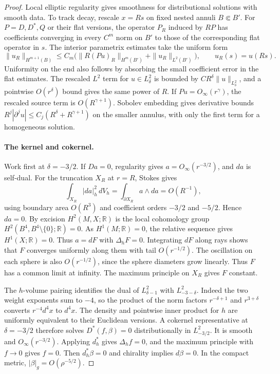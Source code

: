 \documentclass[11pt,letterpaper]{article}
\numberwithin{equation}{section}
\begin{document}
\begin{proof}
Local elliptic regularity gives smoothness for distributional solutions
with smooth data. To track decay, rescale \(x=Rs\) on fixed nested
annuli \(B\Subset B'\). For \(P=D,D^*,Q\) or their flat versions, the
operator \(P_R\) induced by \(RP\) has coefficients converging in every
\(C^m\) norm on \(B'\) to those of the corresponding flat operator in
\(s\). The interior parametrix estimates
\cite[estimate~(2.4)]{LockhartMcOwen1985Elliptic} take the uniform form
\[
 \|u_R\|_{H^{m+1}(B)}
 \le C_m\bigl(\|R(Pu)_R\|_{H^m(B')}+\|u_R\|_{L^2(B')}\bigr),
 \qquad u_R(s)=u(Rs).
\]
Uniformity on the end also follows by absorbing the small coefficient
error in the flat estimates. The rescaled \(L^2\) term for \(u\in
L^2_\delta\) is bounded by \(C R^\delta\|u\|_{L^2_\delta}\), and a
pointwise \(O(r^\delta)\) bound gives the same power of \(R\).
If \(Pu=O_\infty(r^\gamma)\), the rescaled source term is
\(O(R^{\gamma+1})\). Sobolev embedding gives derivative bounds
\(R^j|\partial^j u|\le C_j(R^\delta+R^{\gamma+1})\) on the smaller
annulus, with only the first term for a homogeneous solution.

\paragraph{The kernel and cokernel.}
Work first at \(\delta=-3/2\). If \(Da=0\), regularity gives
\(a=O_\infty(r^{-3/2})\), and \(da\) is self-dual. For the
truncation \(X_R\) at \(r=R\), Stokes gives
\[
 \int_{X_R}|da|_h^2\,dV_h
 =\int_{\partial X_R}a\wedge da=O(R^{-1}),
\]
using boundary area \(O(R^3)\) and coefficient orders \(-3/2\)
and \(-5/2\). Hence \(da=0\).
By excision \(H^2(M,X;\mathbb R)\) is the local cohomology group
\(H^2(B^4,B^4\setminus\{0\};\mathbb R)=0\). As \(H^1(M;\mathbb R)=0\),
the relative sequence gives \(H^1(X;\mathbb R)=0\). Thus \(a=dF\)
with \(\Delta_hF=0\).
Integrating \(dF\) along rays shows that \(F\) converges uniformly
along them with tail \(O(r^{-1/2})\). The oscillation on each sphere is
also \(O(r^{-1/2})\), since the sphere diameters grow linearly. Thus
\(F\) has a common limit at infinity. The maximum principle on \(X_R\)
gives \(F\) constant.

The \(h\)-volume pairing identifies the dual of \(L^2_{\delta-1}\)
with \(L^2_{-3-\delta}\). Indeed the two weight exponents sum to
\(-4\), so the product of the norm factors \(r^{-\delta+1}\) and
\(r^{3+\delta}\) converts \(r^{-4}d^4x\) to \(d^4x\). The density
and pointwise inner product for \(h\) are uniformly equivalent to
their Euclidean versions. A cokernel representative at \(\delta=-3/2\)
therefore solves
\(D^*(f,\beta)=0\) distributionally in \(L^2_{-3/2}\).
It is smooth and \(O_\infty(r^{-3/2})\).
Applying \(d_h^*\) gives \(\Delta_h f=0\), and the maximum principle
with \(f\to0\) gives \(f=0\). Then \(d_h^*\beta=0\) and chirality
implies \(d\beta=0\). In the compact metric,
\(|\beta|_g=O(\rho^{-5/2})\).


\end{proof}
\end{document}
